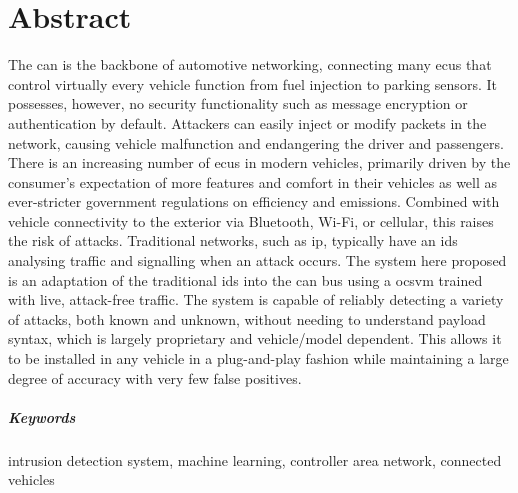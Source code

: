 \chapter*{Abstract}


The \gls{can} is the backbone of automotive networking, connecting many \glspl{ecu} that control virtually every vehicle function from fuel injection to parking sensors. It possesses, however, no security functionality such as message encryption or authentication by default. Attackers can easily inject or modify packets in the network, causing vehicle malfunction and endangering the driver and passengers. There is an increasing number of \glspl{ecu} in modern vehicles, primarily driven by the consumer's expectation of more features and comfort in their vehicles as well as ever-stricter government regulations on efficiency and emissions. Combined with vehicle connectivity to the exterior via Bluetooth, Wi-Fi, or cellular, this raises the risk of attacks. Traditional networks, such as \gls{ip}, typically have an \gls{ids} analysing traffic and signalling when an attack occurs. The system here proposed is an adaptation of the traditional \gls{ids} into the \gls{can} bus using a \gls{ocsvm} trained with live, attack-free traffic. The system is capable of reliably detecting a variety of attacks, both known and unknown, without needing to understand payload syntax, which is largely proprietary and vehicle/model dependent. This allows it to be installed in any vehicle in a plug-and-play fashion while maintaining a large degree of accuracy with very few false positives.

\paragraph{Keywords} intrusion detection system, machine learning, controller area network, connected vehicles